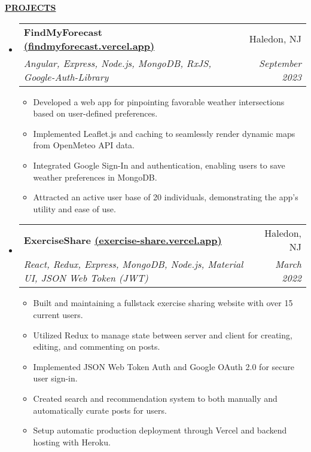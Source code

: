 \documentclass[letterpaper,11pt]{article}
\makeatletter
\newcommand{\resheading}[1]{{{\begin{minipage}{\textwidth}{\textbf{#1 \vphantom{p\^{E}}}}\end{minipage}}}}
\newcommand{\ressubheading}[4]{
\begin{tabular*}{7.3in}{l@{\extracolsep{\fill}}r}
		\textbf{#1} & #2 \\
		\textit{#3} & \textit{#4} \\
\end{tabular*}}
\makeatother
\begin{document}
\begin{spacing}{1.2}
\begin{itemize}[leftmargin=*]
\end{itemize}
\vspace{-0.0in}

\resheading{\hspace{0em}\uline{\textsc{PROJECTS}\hfill}}
\vspace{-0.2in}

\begin{itemize}[leftmargin=*]

\item
	\ressubheading{FindMyForecast \href{https://findmyforecast.vercel.app}{(findmyforecast.vercel.app)}}{Haledon, NJ}{Angular, Express, Node.js, MongoDB, RxJS, Google-Auth-Library}{September 2023}
	\vspace{-0.05in}
	\begin{itemize}[leftmargin=*]
	\setlength\itemsep{0.2em}
		\item{Developed a web app for pinpointing favorable weather intersections based on user-defined preferences.}
		\item{Implemented Leaflet.js and caching to seamlessly render dynamic maps from OpenMeteo API data.}
		\item{Integrated Google Sign-In and authentication, enabling users to save weather preferences in MongoDB.}
		\item{Attracted an active user base of 20 individuals, demonstrating the app's utility and ease of use.}
	\end{itemize}

\item
	\ressubheading{ExerciseShare \href{https://exercise-share.vercel.app}{(exercise-share.vercel.app)}}{Haledon, NJ}{React, Redux, Express, MongoDB, Node.js, Material UI, JSON Web Token (JWT)}{March 2022}
	\vspace{-0.05in}
	\begin{itemize}[leftmargin=*]
	\setlength\itemsep{0.2em}
		\item{Built and maintaining a fullstack exercise sharing website with over 15 current users.}
		\item{Utilized Redux to manage state between server and client for creating, editing, and commenting on posts.}
		\item{Implemented JSON Web Token Auth and Google OAuth 2.0 for secure user sign-in. }
		\item{Created search and recommendation system to both manually and automatically curate posts for users.}
		\item{Setup automatic production deployment through Vercel and backend hosting with Heroku.}
	\end{itemize}
	


\end{itemize}
\end{spacing}
\end{document}
